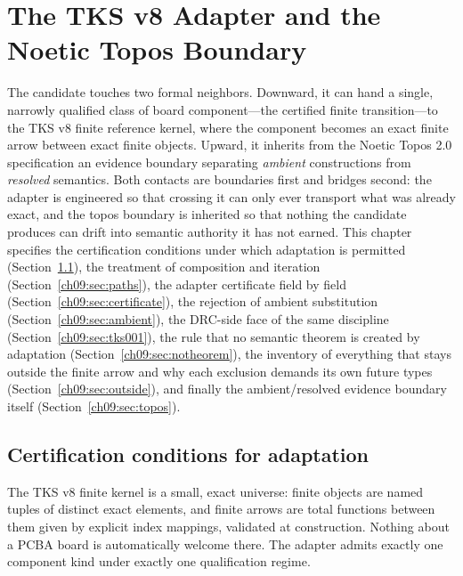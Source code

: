 \chapter{The TKS v8 Adapter and the Noetic Topos Boundary}\label{ch09:adapter}

The candidate touches two formal neighbors. Downward, it can hand a single, narrowly qualified class of board component---the certified finite transition---to the TKS v8 finite reference kernel, where the component becomes an exact finite arrow between exact finite objects. Upward, it inherits from the Noetic Topos 2.0 specification an evidence boundary separating \emph{ambient} constructions from \emph{resolved} semantics. Both contacts are boundaries first and bridges second: the adapter is engineered so that crossing it can only ever transport what was already exact, and the topos boundary is inherited so that nothing the candidate produces can drift into semantic authority it has not earned. This chapter specifies the certification conditions under which adaptation is permitted (Section~\ref{ch09:sec:cert}), the treatment of composition and iteration (Section~\ref{ch09:sec:paths}), the adapter certificate field by field (Section~\ref{ch09:sec:certificate}), the rejection of ambient substitution (Section~\ref{ch09:sec:ambient}), the DRC-side face of the same discipline (Section~\ref{ch09:sec:tks001}), the rule that no semantic theorem is created by adaptation (Section~\ref{ch09:sec:notheorem}), the inventory of everything that stays outside the finite arrow and why each exclusion demands its own future types (Section~\ref{ch09:sec:outside}), and finally the ambient/resolved evidence boundary itself (Section~\ref{ch09:sec:topos}).

\section{Certification conditions for adaptation}\label{ch09:sec:cert}

The TKS v8 finite kernel is a small, exact universe: finite objects are named tuples of distinct exact elements, and finite arrows are total functions between them given by explicit index mappings, validated at construction. Nothing about a PCBA board is automatically welcome there. The adapter admits exactly one component kind under exactly one qualification regime.


